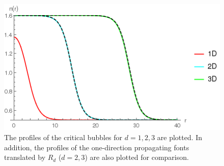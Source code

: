 \documentclass{article}
\begin{document}
\begin{figure}
\centering
\includegraphics[width=0.5\linewidth]{fig1/comp_prop_bubble.png}
\caption{\label{fig_comp_prop_bubble}The profiles of the critical bubbles for $d=1,2,3$ are plotted. In addition, the profiles of the one-direction propagating fonts translated by $R_d$ ($d=2,3$) are also plotted for comparison.}
\end{figure}
\end{document}
